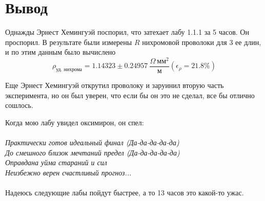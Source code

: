 \documentclass{article}
\begin{document}
	\section{Вывод}
	
	Однажды Эрнест Хемингуэй поспорил, что затехает лабу 1.1.1 за 5 часов. Он проспорил. 
	В результате были измерены $R$ нихромовой проволоки для 3 ее длин, и по этим данным было вычислено $$\rho_{\text{уд. нихрома}} = 1.14323 \pm 0.24957 ~\frac{\Omega ~\text{мм}^{2}}{\text{м}} (\epsilon_{\rho} = 21.8 \%)$$
	
	Еще Эрнест Хемингуэй открутил проволоку и заруинил вторую часть эксперимента, но он был уверен, что если бы он это не сделал, все бы отлично сошлось.
	
	Когда мою лабу увидел оксимирон, он спел:\\\\ 
	\textit{Практически готов идеальный финал (Да-да-да-да-да)\\
		До смешного близок мечтаний предел (Да-да-да-да-да)\\
		Оправдана уйма стараний и сил\\
		Неизбежно верен счастливый прогноз...}\\\\
	Надеюсь следующие лабы пойдут быстрее, а то 13 часов это какой-то ужас. 
	
	
\end{document}
